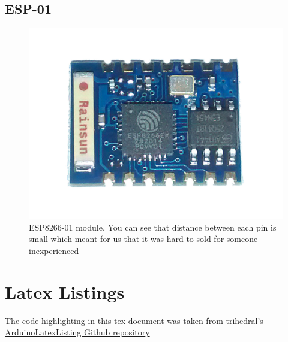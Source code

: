 \documentclass[a4paper,12pt,oneside,openright,titlepage]{book}
\begin{document}
\section{ESP-01}
\begin{figure}[!ht]
	\centering
		\includegraphics[scale=0.20]{ESP-01}
	\caption{ESP8266-01 module. You can see that distance between each pin is small which meant for us that it was hard to sold for someone inexperienced}
	\label{fig:ESP}
\end{figure}

\chapter{Latex Listings}
The code highlighting in this tex document was taken from \href{https://github.com/trihedral/ArduinoLatexListing/blob/master/arduinoLanguage.tex}{trihedral's ArduinoLatexListing Github repository}
\end{document}
